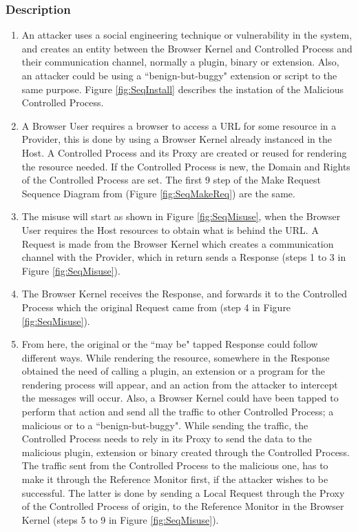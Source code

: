 \documentclass{sig-alternate-05-2015}
\begin{document}
  \subsubsection*{Description}
      \begin{enumerate}
        \item An attacker uses a social engineering technique or vulnerability in the system, and creates an entity between the Browser Kernel and Controlled Process and their communication channel, normally a plugin, binary or extension. Also, an attacker could be using a ``benign-but-buggy" extension or script to the same purpose. Figure \ref{fig:SeqInstall} describes the instation of the Malicious Controlled Process.
        \item A Browser User requires a browser to access a URL for some resource in a Provider, this is done by using a Browser Kernel already instanced in the Host. A Controlled Process and its Proxy are created or reused for rendering the resource needed. If the Controlled Process is new, the Domain and Rights of the Controlled Process are set. The first 9 step of the Make Request Sequence Diagram from \cite{silva2015} (Figure \ref{fig:SeqMakeReq}) are the same.
        \item The misuse will start as shown in Figure \ref{fig:SeqMisuse}, when the Browser User requires the Host resources to obtain what is behind the URL. A Request is made from the Browser Kernel which creates a communication channel with the Provider, which in return sends a Response (steps 1 to 3 in Figure \ref{fig:SeqMisuse}).
        \item The Browser Kernel receives the Response, and forwards it to the Controlled Process which the original Request came from (step 4 in Figure \ref{fig:SeqMisuse}).
        \item From here, the original or the ``may be" tapped Response could follow different ways. While rendering the resource, somewhere in the Response obtained the need of calling a plugin, an extension or a program for the rendering process will appear, and an action from the attacker to intercept the messages will occur. Also, a Browser Kernel could have been tapped to perform that action and send all the traffic to other Controlled Process; a malicious or to a ``benign-but-buggy". While sending the traffic, the Controlled Process needs to rely in its Proxy to send the data to the malicious plugin, extension or binary created through the Controlled Process. The traffic sent from the Controlled Process to the malicious one, has to make it through the Reference Monitor first, if the attacker wishes to be successful. The latter is done by sending a Local Request through the Proxy of the Controlled Process of origin, to the Reference Monitor in the Browser Kernel (steps 5 to 9 in Figure \ref{fig:SeqMisuse}).

\end{enumerate}
\end{document}
